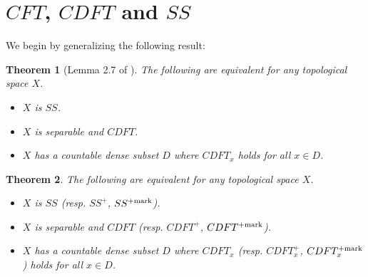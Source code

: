 \documentclass{amsart}
\theoremstyle{plain}
\newtheorem{theorem}{Theorem}
\theoremstyle{definition}
\theoremstyle{remark}
\theoremstyle{plain}
\theoremstyle{definition}
\theoremstyle{remark}
\begin{document}
\section{\(CFT\), \(CDFT\) and \(SS\)}

We begin by generalizing the following result:

\begin{theorem}[Lemma 2.7 of \cite{MR2678950}]
  The following are equivalent for any topological space \(X\).
  \begin{itemize}
    \item \(X\) is \(SS\).
    \item \(X\) is separable and \(CDFT\).
    \item \(X\) has a countable dense subset \(D\) where
          \(CDFT_x\) holds for all \(x\in D\).
  \end{itemize}
\end{theorem}

\begin{theorem}
  The following are equivalent for any topological space \(X\).
  \begin{itemize}
    \item \(X\) is \(SS\) (resp. \(SS^+\), \(SS^{+\mathrm{mark}}\)).
    \item \(X\) is separable and \(CDFT\)
          (resp. \(CDFT^+\), \(CDFT^{+\mathrm{mark}}\)).
    \item \(X\) has a countable dense subset \(D\) where
          \(CDFT_x\) (resp. \(CDFT_x^+\), \(CDFT_x^{+\mathrm{mark}}\))
          holds for all \(x\in D\).
  \end{itemize}
\end{theorem}
\end{document}
